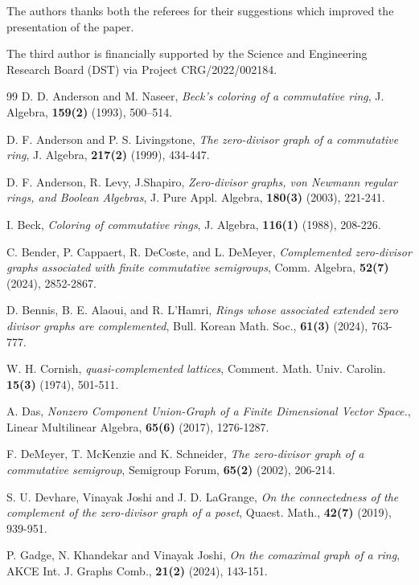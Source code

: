\documentclass[10pt,one side,emlines]{amsart}
\theoremstyle{definition}
\begin{document}
The authors thanks both the referees for their suggestions which improved the presentation of the paper.
	
	The third author is financially supported by the Science and Engineering Research Board (DST) via Project CRG/2022/002184.


\begin{thebibliography}{99}
	 D. D.	Anderson and M. Naseer, {\it Beck’s coloring of a commutative ring},	J. Algebra, {\bf 159(2)} (1993), 500–514.
	
	 D. F. Anderson and P. S. Livingstone, {\it The zero-divisor graph of a commutative ring}, J. Algebra, {\bf 217(2)} (1999), 434-447.
	
	 D. F. Anderson, R. Levy, J.Shapiro, {\it Zero-divisor graphs, von Newmann regular rings, and Boolean Algebras}, J. Pure Appl. Algebra, {\bf 180(3)} (2003), 221-241.
	
	
	 I. Beck,  {\it Coloring of commutative rings}, J. Algebra, {\bf 116(1)} (1988), 208-226.
	
	 C. Bender, P. Cappaert, R. DeCoste, and L. DeMeyer, {\it Complemented zero-divisor graphs associated with finite commutative semigroups}, Comm. Algebra, \textbf{52(7)} (2024), 2852-2867.
	
	 D. Bennis, B. E. Alaoui, and R. L'Hamri,  {\it Rings whose associated extended zero divisor graphs are complemented}, Bull. Korean Math. Soc., {\bf 61(3)} (2024), 763-777.
	
	
	 W. H. Cornish, {\it quasi-complemented lattices}, Comment. Math. Univ. Carolin. \textbf{15(3)} (1974), 501-511.
	
	 A. Das, \textit{Nonzero Component Union-Graph of a Finite Dimensional	Vector Space.}, Linear Multilinear Algebra, \textbf{65(6)}
	(2017), 1276-1287.
	
	 F. DeMeyer, T. McKenzie and K. Schneider, {\it The zero-divisor graph of a commutative semigroup}, Semigroup Forum, {\bf 65(2)} (2002), 206-214.
	
	 S. U. Devhare, Vinayak Joshi and J. D. LaGrange,  {\it On the connectedness of the complement of the zero-divisor graph of a poset}, Quaest. Math., {\bf 42(7)} (2019), 939-951. 
	
	 P. Gadge, N. Khandekar and Vinayak Joshi, {\it On the comaximal graph of a ring}, AKCE Int. J. Graphs Comb., {\bf 21(2)} (2024), 143-151.
	

\end{thebibliography}
\end{document}
